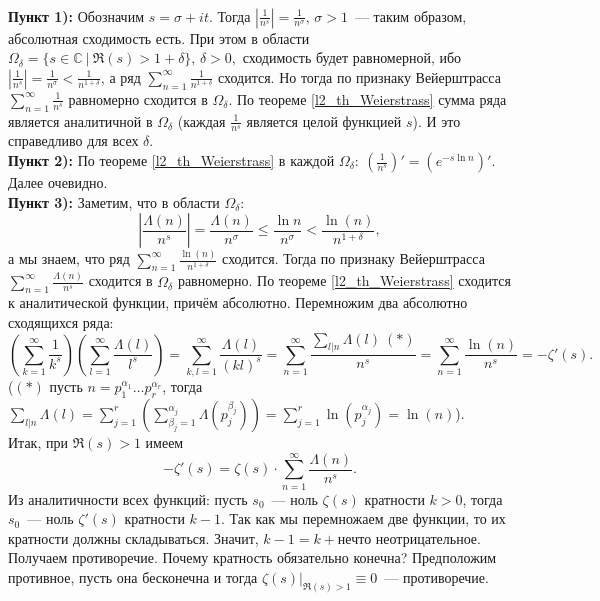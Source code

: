 \begin{pf}~\\
	\textbf{Пункт 1):} Обозначим $s=\sigma+it.$ Тогда $\displaystyle \left| \frac{1}{n^s} \right| = \frac{1}{n^\sigma},\,\sigma > 1$ — таким образом, абсолютная сходимость есть. При этом в области $\Omega_\delta = \{ s \in \mathbb{C} \ | \ \Re(s) > 1+\delta \},\, \delta>0,$ сходимость будет равномерной, ибо $\displaystyle \left| \frac{1}{n^s} \right| = \frac{1}{n^\sigma} < \frac{1}{n^{1+\delta}}$, а ряд $\displaystyle \sum\limits_{n=1}^\infty \frac{1}{n^{1+\delta}}$ сходится. Но тогда по признаку Вейерштрасса $\displaystyle \sum\limits_{n=1}^\infty \frac{1}{n^s}$ равномерно сходится в $\Omega_\delta.$ По теореме \ref{l2_th_Weierstrass} сумма ряда является аналитичной в $\Omega_\delta$ (каждая $\displaystyle \frac{1}{n^s}$ является целой функцией $s$). И это справедливо для всех $\delta$.\\
	\textbf{Пункт 2):} По теореме \ref{l2_th_Weierstrass} в каждой $\displaystyle \Omega_\delta: \ \left(\frac{1}{n^s}\right)' = \left(e^{-s \ln n}\right)'.$ Далее очевидно.\\
	\textbf{Пункт 3):} Заметим, что в области $\displaystyle \Omega_\delta:$ $$\left| \frac{\Lambda(n)}{n^s} \right| = \frac{\Lambda(n)}{n^\sigma} \leq \frac{\ln n}{n^\sigma} < \frac{\ln(n)}{n^{1+\delta}},$$ а мы знаем, что ряд $\displaystyle \sum\limits_{n=1}^\infty \frac{\ln(n)}{n^{1+\delta}}$ сходится. Тогда по признаку Вейерштрасса $\displaystyle \sum\limits_{n=1}^\infty \frac{\Lambda(n)}{n^s}$ сходится в $\Omega_\delta$ равномерно. По теореме \ref{l2_th_Weierstrass} сходится к аналитической функции, причём абсолютно. Перемножим два абсолютно сходящихся ряда:
		$$\left( \sum\limits_{k=1}^\infty \frac{1}{k^s} \right)\left( \sum\limits_{l=1}^\infty \frac{\Lambda(l)}{l^s} \right) = \sum\limits_{k,l=1}^\infty \frac{\Lambda(l)}{(kl)^s} = \sum\limits_{n=1}^\infty \frac{\sum_{l | n}\Lambda(l) \ (\ast)}{n^s} = \sum\limits_{n=1}^\infty \frac{\ln(n)}{n^s} = -\zeta'(s).$$
		($(\ast)$ пусть $n = p_1^{\alpha_1}\dots p_r^{\alpha_r}$, тогда $\displaystyle \sum\limits_{l | n}\Lambda(l) = \sum\limits_{j=1}^r \left( \sum\limits_{\beta_j=1}^{\alpha_j} \Lambda\left(p_j^{\beta_j} \right) \right) = \sum\limits_{j=1}^r \ln\left( p_j^{\alpha_j} \right) = \ln(n)$).\\
	Итак, при $\Re(s)>1$ имеем
		$$-\zeta'(s) = \zeta(s) \cdot \sum\limits_{n=1}^\infty \frac{\Lambda(n)}{n^s}.$$
	Из аналитичности всех функций: пусть $s_0$ — ноль $\zeta(s)$ кратности $k>0$, тогда $s_0$ — ноль $\zeta'(s)$ кратности $k-1$. Так как мы перемножаем две функции, то их кратности должны складываться. Значит, $k-1=k+$нечто неотрицательное.  Получаем противоречие. Почему кратность обязательно конечна? Предположим противное, пусть она бесконечна и тогда $\zeta(s)|_{\Re(s)>1} \equiv 0$ — противоречие.
\end{pf}

